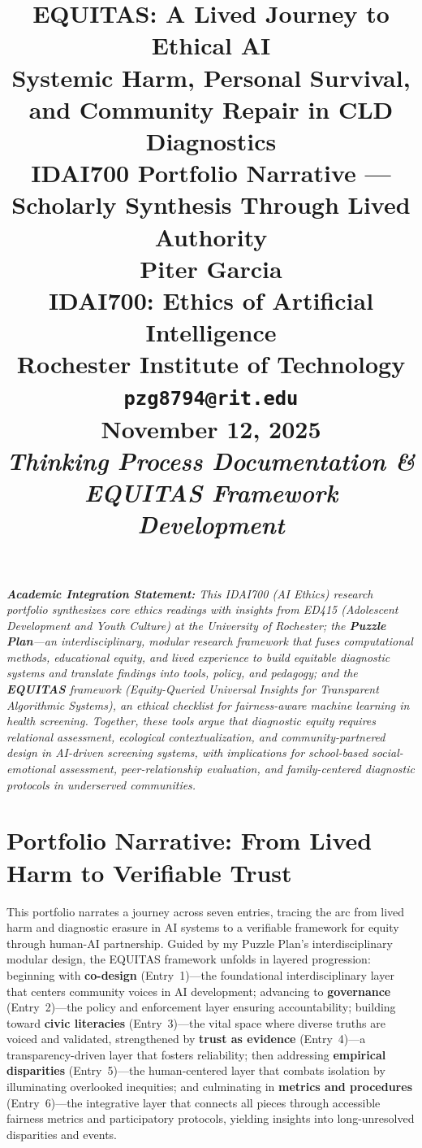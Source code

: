\documentclass[11pt,twoside]{article}
\title{
\vspace*{1.5in}
\textbf{\Huge EQUITAS: A Lived Journey to Ethical AI}\\[0.5em]
\Large Systemic Harm, Personal Survival, and Community Repair in CLD Diagnostics\\[1.5em]
\large IDAI700 Portfolio Narrative --- Scholarly Synthesis Through Lived Authority\\[2em]

\vfill
\Large \textbf{Piter Garcia}\\
\normalsize IDAI700: Ethics of Artificial Intelligence\\
Rochester Institute of Technology\\
\texttt{pzg8794@rit.edu}\\[1em]

\large \textbf{November 12, 2025}\\
\normalsize \textit{Thinking Process Documentation \& EQUITAS Framework Development}
}
\author{}
\date{}
\begin{document}
\thispagestyle{empty}
\maketitle

\vspace{0.5in}
\noindent\textit{\tiny\textbf{Academic Integration Statement:} 
This IDAI700 (AI Ethics) research portfolio synthesizes core ethics readings with insights from ED415 (Adolescent Development and Youth Culture) at the University of Rochester; the \textbf{Puzzle Plan}---an interdisciplinary, modular research framework that fuses computational methods, educational equity, and lived experience to build equitable diagnostic systems and translate findings into tools, policy, and pedagogy; and the \textbf{EQUITAS} framework (Equity-Queried Universal Insights for Transparent Algorithmic Systems), an ethical checklist for fairness-aware machine learning in health screening. Together, these tools argue that \emph{diagnostic equity requires relational assessment, ecological contextualization, and community-partnered design} in AI-driven screening systems, with implications for school-based social-emotional assessment, peer-relationship evaluation, and family-centered diagnostic protocols in underserved communities.}
\newpage
\pagestyle{fancy}


\section*{Portfolio Narrative: From Lived Harm to Verifiable Trust}
\noindent This portfolio narrates a journey across seven entries, tracing the arc from lived harm and diagnostic erasure in AI systems to a verifiable framework for equity through human-AI partnership. Guided by my Puzzle Plan's interdisciplinary modular design, the EQUITAS framework unfolds in layered progression: beginning with \textbf{co-design} (Entry~1)---the foundational interdisciplinary layer that centers community voices in AI development; advancing to \textbf{governance} (Entry~2)---the policy and enforcement layer ensuring accountability; building toward \textbf{civic literacies} (Entry~3)---the vital space where diverse truths are voiced and validated, strengthened by \textbf{trust as evidence} (Entry~4)---a transparency-driven layer that fosters reliability; then addressing \textbf{empirical disparities} (Entry~5)---the human-centered layer that combats isolation by illuminating overlooked inequities; and culminating in \textbf{metrics and procedures} (Entry~6)---the integrative layer that connects all pieces through accessible fairness metrics and participatory protocols, yielding insights into long-unresolved disparities and events.
\end{document}
